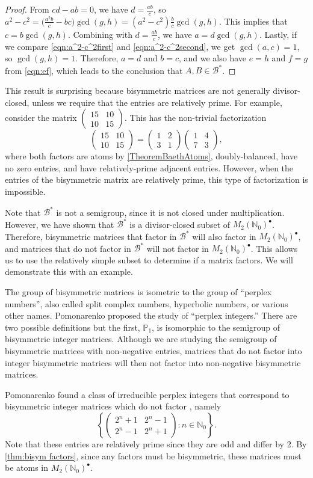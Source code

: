 \documentclass{amsart}
\newcommand{\pmx}[4]{\begin{pmatrix} #1 & #2 \\ #3 & #4 \end{pmatrix}}
\newcommand{\mtwo}{M_2(\mathbb{N}_0)^\bullet}
\newcommand{\B}{\mathcal{B}}
\newcommand{\Bstar}{\mathcal{B}^*}
\begin{document}
\begin{proof}
From $cd-ab=0$, we have $d=\frac{ab}{c}$, so $a^2-c^2=\big(\frac{a^2b}{c}-bc\big)\gcd(g,h)=(a^2-c^2)\frac{b}{c}\gcd(g,h)$. This implies that $c=b\gcd(g,h)$. Combining with $d=\frac{ab}{c}$, we have $a=d\gcd(g,h)$. Lastly, if we compare \eqref{eqn:a^2-c^2first} and \eqref{eqn:a^2-c^2second}, we get $\gcd(a,c)=1$, so $\gcd(g,h)=1$. Therefore, $a=d$ and $b=c$, and we also have $e=h$ and $f=g$ from \eqref{eqn:ef}, which leads to the conclusion that $A,B\in\Bstar$.
\end{proof}

This result is surprising because bisymmetric matrices are not generally divisor-closed, unless we require that the entries are relatively prime. For example, consider the matrix $\pmx{15}{10}{10}{15}$. This has the non-trivial factorization
\begin{equation*}\label{ex1factor}
\pmx{15}{10}{10}{15}=\pmx{1}{2}{3}{1}\pmx{1}{4}{7}{3},
\end{equation*}
where both factors are atoms by \cref{TheoremBaethAtoms}, doubly-balanced, have no zero entries, and have relatively-prime adjacent entries. However, when the entries of the bisymmetric matrix are relatively prime, this type of factorization is impossible.

Note that $\B^*$ is not a semigroup, since it is not closed under multiplication. However, we have shown that $\B^*$ is a divisor-closed subset of $\mtwo$. Therefore, bisymmetric matrices that factor in $\B^*$ will also factor in $\mtwo$, and matrices that do not factor in $\B^*$ will not factor in $\mtwo$. This allows us to use the relatively simple subset to determine if a matrix factors. We will demonstrate this with an example. 

The group of bisymmetric matrices is isometric to the group of ``perplex numbers'', also called split complex numbers, hyperbolic numbers, or various other names. Pomonarenko proposed the study of ``perplex integers.'' There are two possible definitions but the first, $\mathbb{P}_1$, is isomorphic to the semigroup of bisymmetric integer matrices. Although we are studying the semigroup of bisymmetric matrices with non-negative entries, matrices that do not factor into integer bisymmetric matrices will then not factor into non-negative bisymmetric matrices.

Pomonarenko found a class of  irreducible perplex integers that correspond to bisymmetric integer matrices which do not factor \cite[Theorem 5]{Ponom22}, namely
$$\left\{\pmx{2^n+1}{2^n-1}{2^n-1}{2^n+1}:n\in \mathbb{N}_0\right\}.$$
Note that these entries are relatively prime since they are odd and differ by 2. By \cref{thm:bisym factors}, since any factors must be bisymmetric, these matrices must be atoms in $\mtwo$.
\end{document}

